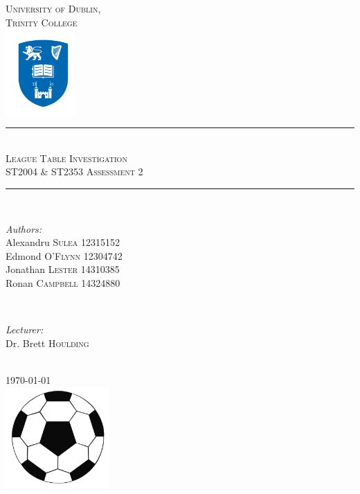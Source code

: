 \documentclass[12pt]{article}
\begin{document}
\begin{titlepage}

\newcommand{\HRule}{\rule{\linewidth}{0.5mm}}

\center
\textsc{\LARGE University of Dublin,\\Trinity College}\\[1.0cm]
\includegraphics[width=0.2\textwidth]{logo.png}

\HRule \\[0.4cm]
\textsc{\Large League Table Investigation}\\[0.25cm]
\textsc{\large ST2004 \& ST2353 Assessment 2}\\[0.1cm]
\HRule \\[0.4cm]
 
\begin{minipage}{0.5\textwidth}
\begin{flushleft} \large
\emph{Authors:}
\\Alexandru \textsc{Sulea} 12315152
\\Edmond \textsc{O'Flynn} 12304742
\\Jonathan \textsc{Lester} 14310385
\\Ronan \textsc{Campbell} 14324880
\end{flushleft}
\end{minipage}
~
\begin{minipage}{0.4\textwidth}
\begin{flushleft} 
\large
\emph{Lecturer:} \\
Dr. Brett \textsc{Houlding}
\vspace{1.9cm}
\end{flushleft}
\end{minipage}\\[2cm]

{\large \today}\\[1cm] 

\includegraphics[width=0.3\textwidth]{ball.jpeg}
\clearpage
\end{titlepage}
\end{document}
